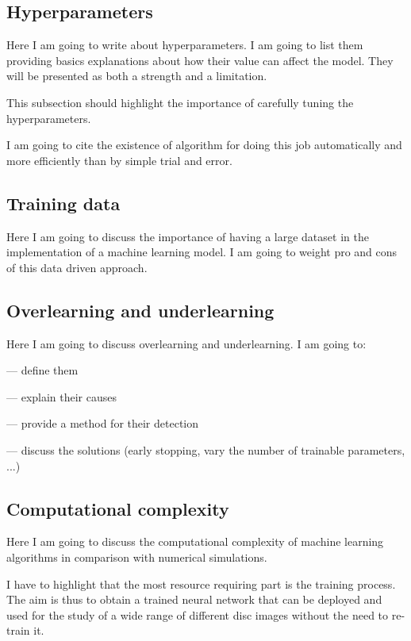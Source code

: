 \documentclass[a4paper,10pt]{report}
\begin{document}
\subsection{Hyperparameters}

Here I am going to write about hyperparameters. I am going to list them
providing basics explanations about how their value can affect the model.
They will be presented as both a strength and a limitation.

This subsection should highlight the importance of carefully tuning the hyperparameters.

I am going to cite the existence of algorithm for doing this job automatically and more
efficiently than by simple trial and error.

\subsection{Training data}

Here I am going to discuss the importance of having a large dataset in the implementation
of a machine learning model. I am going to weight pro and cons of this data driven 
approach.

\subsection{Overlearning and underlearning}

Here I am going to discuss overlearning and underlearning. 
I am going to:

    — define them

    — explain their causes

    — provide a method for their  detection 

    — discuss the solutions (early stopping, vary the number of trainable parameters, ...)

\subsection{Computational complexity}
Here I am going to discuss the computational complexity of machine learning
 algorithms in comparison with numerical simulations.

I have to highlight that the most resource requiring part is the training process.
The aim is thus to obtain a trained neural network that can be deployed and used for the study of
a wide range of different disc images without the need to re-train it.
\end{document}
